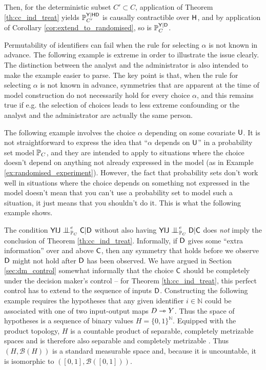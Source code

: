 \begin{example}
Then, for the deterministic subset $C'\subset C$, application of Theorem \ref{th:cc_ind_treat} yields $\mathbb{P}_{C'}^{\mathsf{Y}|\mathsf{HD}}$ is causally contractible over $\mathsf{H}$, and by application of Corollary \ref{cor:extend_to_randomised}, so is $\mathbb{P}_{C}^{\mathsf{Y}|\mathsf{D}}$.
\end{example}

Permutability of identifiers can fail when the rule for selecting $\alpha$ is not known in advance. The following example is extreme in order to illustrate the issue clearly. The distinction between the analyst and the administrator is also intended to make the example easier to parse. The key point is that, when the rule for selecting $\alpha$ is not known in advance, symmetries that are apparent at the time of model construction do not necessarily hold for every choice $\alpha$, and this remains true if e.g. the selection of choices leads to less extreme confounding or the analyst and the administrator are actually the same person.

The following example involves the choice $\alpha$ depending on some covariate $\mathsf{U}$. It is not straightforward to express the idea that ``$\alpha$ depends on $\mathsf{U}$'' in a probability set model $\mathbb{P}_C$, and they are intended to apply to situations where the choice doesn't depend on anything not already expressed in the model (as in Example \ref{ex:randomised_experiment}). However, the fact that probability sets don't work well in situations where the choice depends on something not expressed in the model doesn't mean that you can't use a probability set to model such a situation, it just means that you shouldn't do it. This is what the following example shows.

The condition $\RV{YIJ}\CI^e_{\prob{P}_C} \RV{C}|\RV{D}$ without also having $\RV{YIJ}\CI^e_{\prob{P}_C} \RV{D}|\RV{C}$ does \emph{not} imply the conclusion of Theorem \ref{th:cc_ind_treat}. Informally, if $\mathsf{D}$ gives some ``extra information'' over and above $\mathsf{C}$, then any symmetry that holds before we observe $\mathsf{D}$ might not hold after $\mathsf{D}$ has been observed. We have argued in Section \ref{sec:dm_control} somewhat informally that the choice $\mathsf{C}$ should be completely under the decision maker's control -- for Theorem \ref{th:cc_ind_treat}, this perfect control has to extend to the sequence of inputs $\mathsf{D}$. Constructing the following example requires the hypotheses that any given identifier $i\in\mathbb{N}$ could be associated with one of two input-output maps $D\rightarrowtriangle Y$. Thus the space of hypotheses is a sequence of binary values $H=\{0,1\}^{\mathbb{N}}$. Equipped with the product topology, $H$ is a countable product of separable, completely metrizable spaces and is therefore also separable and completely metrizable \citep[Thm. 16.4,Thm. 24.11]{willard_general_1970}. Thus $(H,\mathcal{B}(H))$ is a standard measurable space and, because it is uncountable, it is isomorphic to $([0,1],\mathcal{B}([0,1]))$.

